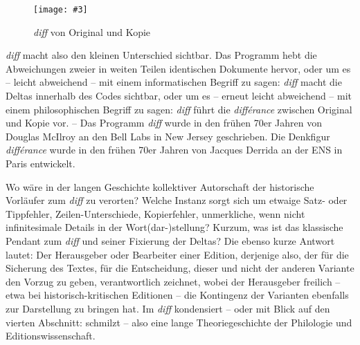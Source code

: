 \documentclass[a4paper,10pt]{article}
\newcommand{\pngbild}[4]{\texttt{[image: \#3]}}
\begin{document}
\begin{figure}[ht]
\begin{center}
\pngbild{433}{176}{../bilder/Abb-2.png}{1.1\textwidth}\\[-3mm]
\caption{\emph{diff} von Original und Kopie}\label{abb:orikopie}
\end{center}
\end{figure}

\enlargethispage{6mm}

\emph{diff} macht also den kleinen Unterschied sichtbar. Das Programm hebt die Abweichungen zweier in weiten Teilen identischen Dokumente hervor, oder um es – leicht abweichend – mit einem informatischen Begriff zu sagen: \emph{diff} macht die Deltas innerhalb des Codes sichtbar, oder um es – erneut leicht abweichend – mit einem philosophischen Begriff zu sagen: \emph{diff} führt die \emph{différance} zwischen Original und Kopie vor. – Das Programm \emph{diff} wurde in den frühen 70er Jahren von Douglas McIlroy an den Bell Labs in New Jersey geschrieben. Die Denkfigur \emph{différance} wurde in den frühen 70er Jahren von Jacques Derrida an der ENS in Paris entwickelt. 

Wo wäre in der langen Geschichte kollektiver Autorschaft der historische Vorläufer zum \emph{diff} zu verorten? Welche Instanz sorgt sich um etwaige Satz- oder Tippfehler, Zeilen-Unterschiede, Kopierfehler, unmerkliche, wenn nicht infinitesimale Details in der Wort(dar-)stellung? Kurzum, was ist das klassische Pendant zum \emph{diff} und seiner Fixierung der Deltas? Die ebenso kurze Antwort lautet: Der Herausgeber oder Bearbeiter einer Edition, derjenige also, der für die Sicherung des Textes, für die Entscheidung, dieser und nicht der anderen Variante den Vorzug zu geben, verantwortlich zeichnet, wobei der Herausgeber freilich – etwa bei historisch-kritischen Editionen – die Kontingenz der Varianten ebenfalls zur Darstellung zu bringen hat. Im \emph{diff} kondensiert – oder mit Blick auf den vierten Abschnitt: schmilzt – also eine lange Theoriegeschichte der Philologie und Editionswissenschaft.  
\end{document}
